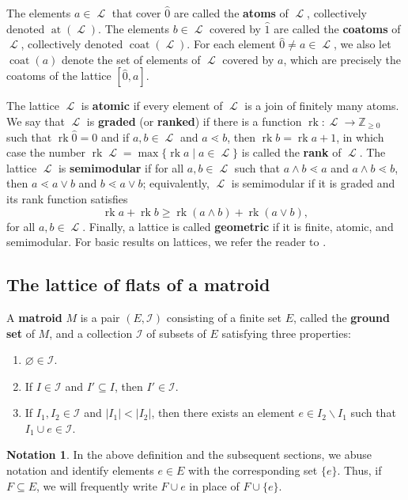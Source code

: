 \documentclass[11pt, reqno]{amsart}
\DeclareMathOperator{\at}{at}					%
\DeclareMathOperator{\coat}{coat}
\renewcommand{\hat}[1]{\widehat{#1}}
\DeclareMathOperator{\LL}{\mathcal{L}}
\DeclareMathOperator{\rk}{rk}
\newcommand{\term}[1]{\textbf{\textsf{#1}}}
\newcommand{\ZZ}{\mathbb{Z}}
\theoremstyle{definition}
\newtheorem*{notation}{Notation}
\numberwithin{equation}{section}
\numberwithin{table}{section}
\begin{document}
\begin{spacing}{1.1}
The elements $a \in \LL$ that cover $\hat{0}$ are called the \term{atoms} of $\LL$, collectively denoted $\at(\LL)$.  The elements $b \in \LL$ covered by $\hat{1}$ are called the \term{coatoms} of $\LL$, collectively denoted $\coat(\LL)$.  For each element $\hat{0} \neq a \in \LL$, we also let $\coat(a)$ denote the set of elements of $\LL$ covered by $a$, which are precisely the coatoms of the lattice $[\hat{0}, a]$.

The lattice $\LL$ is \term{atomic} if every element of $\LL$ is a join of finitely many atoms.  We say that $\LL$ is \term{graded} (or \term{ranked}) if there is a function $\rk:\LL \to \ZZ_{\ge 0}$ such that $\rk \hat{0} = 0$ and if $a,b \in \LL$ and $a \lessdot b$, then $\rk b = \rk a + 1$, in which case the number $\rk \LL  = \max\{\rk a \mid a \in \LL\}$ is called the \term{rank} of $\LL$.  The lattice $\LL$ is \term{semimodular} if for all $a, b \in \LL$ such that $a \wedge b \lessdot a$ and $a \wedge b \lessdot b$, then $a \lessdot a \vee b$ and $b \lessdot a \vee b$; equivalently, $\LL$ is semimodular if it is graded and its rank function satisfies
\[\rk a + \rk b \ge \rk(a \wedge b) + \rk(a \vee b),\]
for all $a,b \in \LL$.  Finally, a lattice is called \term{geometric} if it is finite, atomic, and semimodular.  For basic results on lattices, we refer the reader to \cite{Sta12}.

\subsection{The lattice of flats of a matroid}\label{SSmatroids}

A \term{matroid} $M$ is a pair $(E,\mathcal{I})$ consisting of a finite set $E$, called the \term{ground set} of $M$, and a collection $\mathcal{I}$ of subsets of $E$ satisfying three properties:
\begin{enumerate}
    \item $\varnothing \in \mathcal{I}$.
    \item If $I \in \mathcal{I}$ and $I' \subseteq I$, then $I' \in \mathcal{I}$.
    \item If $I_1,I_2 \in \mathcal{I}$ and $|I_1| < |I_2|$, then there exists an element $e \in I_2 \smallsetminus I_1$ such that $I_1 \cup e \in \mathcal{I}$.
\end{enumerate}

\begin{notation}
In the above definition and the subsequent sections, we abuse notation and identify elements $e \in E$ with the corresponding set $\{e\}$.  Thus, if $F \subseteq E$, we will frequently write $F \cup e$ in place of $F \cup \{e\}$.
\end{notation}


\end{spacing}
\end{document}
